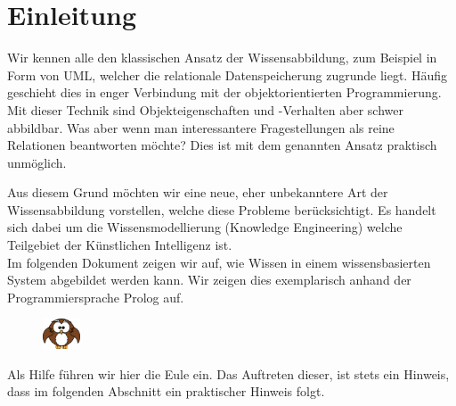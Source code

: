 \chapter{Einleitung}
\label{chap:einleitung}
Wir kennen alle den klassischen Ansatz der Wissensabbildung, zum Beispiel in Form von UML, welcher die relationale Datenspeicherung zugrunde liegt. Häufig geschieht dies in enger Verbindung mit der objektorientierten Programmierung. Mit dieser Technik sind Objekteigenschaften und -Verhalten aber schwer abbildbar. Was aber wenn man interessantere Fragestellungen als reine Relationen beantworten möchte? Dies ist mit dem genannten Ansatz praktisch unmöglich.  

Aus diesem Grund möchten wir eine neue, eher unbekanntere Art der Wissensabbildung vorstellen, welche diese Probleme berücksichtigt. Es handelt sich dabei um die Wissensmodellierung (Knowledge Engineering) welche Teilgebiet der Künstlichen Intelligenz ist. \\
Im folgenden Dokument zeigen wir auf, wie Wissen in einem wissensbasierten System abgebildet werden kann. Wir zeigen dies exemplarisch anhand der Programmiersprache Prolog auf.

\vspace{10pt}
\begin{figure}
    \vspace{-19pt}
    \includegraphics[width=0.1\textwidth]{bilder/owl.png}
\end{figure}
Als Hilfe führen wir hier die Eule ein. Das Auftreten dieser, ist stets ein Hinweis, dass im folgenden Abschnitt ein praktischer Hinweis folgt.
